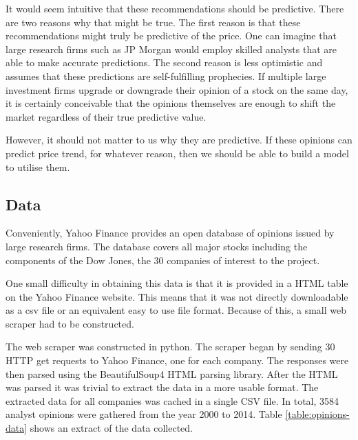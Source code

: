 \documentclass{report}
\begin{document}
It would seem intuitive that these recommendations should be predictive. There are two reasons why that might be true. The first reason is that these recommendations might truly be predictive of the price. One can imagine that large research firms such as JP Morgan would employ skilled analysts that are able to make accurate predictions. The second reason is less optimistic and assumes that these predictions are self-fulfilling prophecies. If multiple large investment firms upgrade or downgrade their opinion of a stock on the same day, it is certainly conceivable that the opinions themselves are enough to shift the market regardless of their true predictive value.

However, it should not matter to us why they are predictive. If these opinions can predict price trend, for whatever reason, then we should be able to build a model to utilise them.

\subsection{Data}

Conveniently, Yahoo Finance provides an open database of opinions issued by large research firms. The database covers all major stocks including the components of the Dow Jones, the 30 companies of interest to the project. 

One small difficulty in obtaining this data is that it is provided in a HTML table on the Yahoo Finance website. This means that it was not directly downloadable as a csv file or an equivalent easy to use file format. Because of this, a small web scraper had to be constructed. 

The web scraper was constructed in python. The scraper began by sending 30 HTTP get requests to Yahoo Finance, one for each company. The responses were then parsed using the BeautifulSoup4 HTML parsing library. After the HTML was parsed it was trivial to extract the data in a more usable format. The extracted data for all companies was cached in a single CSV file. In total, 3584 analyst opinions were gathered from the year 2000 to 2014. Table \ref{table:opinions-data} shows an extract of the data collected.
\end{document}

